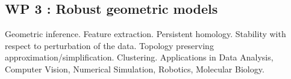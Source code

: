 
\subsection*{WP 3 :  Robust geometric models}
Geometric inference. Feature extraction. Persistent homology.  Stability with respect to perturbation of the data. Topology preserving approximation/simplification. Clustering. Applications in Data Analysis, Computer Vision, Numerical Simulation, Robotics, Molecular Biology.
